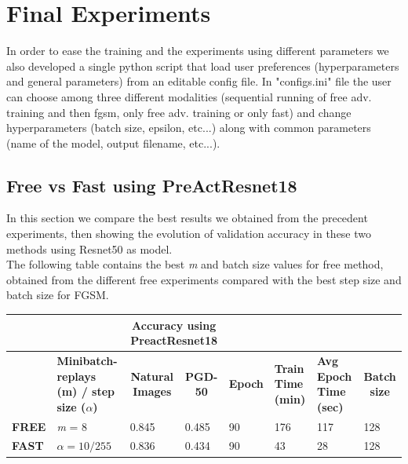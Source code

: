 \documentclass{article}
\begin{document}
\section{Final Experiments}
In order to ease the training and the experiments using different parameters we also developed a single python script that load user preferences (hyperparameters and general parameters) from an editable config file. In "configs.ini" file the user can choose among three different modalities (sequential running of free adv. training and then fgsm, only free adv. training or only fast) and change hyperparameters  (batch size, epsilon, etc...) along with common parameters (name of the model, output filename, etc...).

\subsection{Free vs Fast using PreActResnet18}
In this section we compare the best results we obtained from the precedent
experiments, then showing the evolution of validation accuracy in these two
methods using Resnet50 as model. \\
The following table contains the best \textit{m} and batch size values for free method,
obtained from the different free experiments compared with the best step size
and batch size for FGSM. 
\begin{table}[hbt!]
\begin{tabular}{|l|p{2.1cm}|c|l|l|l|l|l|}
\hline
              & \multicolumn{1}{l|}{}         &
              \multicolumn{2}{c|}{\textbf{Accuracy using PreactResnet18}}
              & \multicolumn{3}{l|}{\textbf{}}
              & \textbf{}                                \\ \hline
 & \textbf{Minibatch-replays (m) / step size ($\alpha$)} & \textbf{Natural
 Images}                      & \multicolumn{1}{c|}{\textbf{PGD-50}} &
 \multicolumn{1}{c|}{\textbf{Epoch}} & \multicolumn{1}{p{1cm}|}{\textbf{Train
 Time (min)}} & \multicolumn{1}{p{1cm}|}{\textbf{Avg Epoch Time (sec)}} &
 \multicolumn{1}{c|}{\textbf{Batch size}} \\ \hline
\textbf{FREE} & \textit{m} = 8 & \multicolumn{1}{l|}{0.845} & { 0.485}         & { 90}
& { 176}                     & { 117}                         & { 128}
\\ \hline
\textbf{FAST} & $\alpha = 10/255$       & \multicolumn{1}{l|}{0.836} & { 0.434}
& { 90}           & { 43}                     & { 28}                         &
{ 128}               \\ \hline
\end{tabular}
\end{table}
\end{document}
